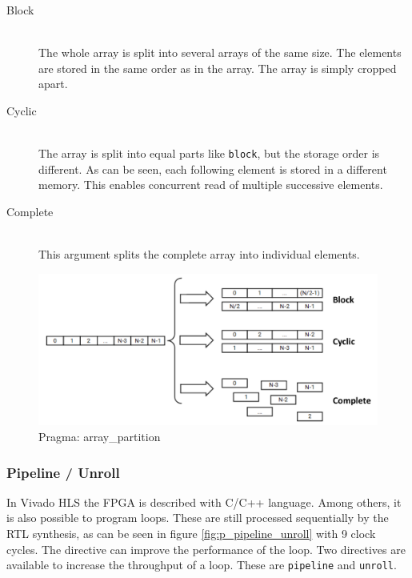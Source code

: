 \begin{description}
\item[Block]\hfill \\
The whole array is split into several arrays of the same size. The elements are stored in the same order as in the array. The array is simply cropped apart.
\item[Cyclic]\hfill \\ 
The array is split into equal parts like \texttt{block}, but the storage order
is different. As can be seen, each following element is stored in a different
memory. This enables concurrent read of multiple successive elements.
\item[Complete]\hfill \\ 
This argument splits the complete array into individual elements.
\end{description}


\begin{figure}[tb!]
    \centering
    \includegraphics[width=\textwidth]{images/theory/array_partition.png}
    \caption{Pragma: array\_partition}
    \label{fig:p_array_partition}
\end{figure}

\subsubsection*{Pipeline / Unroll}
In Vivado HLS the FPGA is described with C/C++ language. Among others, it is also possible to program  loops. These are still processed sequentially by the RTL synthesis, as can be seen in figure \ref{fig:p_pipeline_unroll} with 9 clock cycles. The directive can improve the performance of the loop. Two directives are available to increase the throughput of a loop. These are \texttt{pipeline} and \texttt{unroll}.

